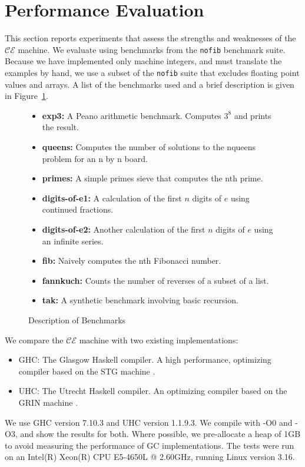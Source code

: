 \section{Performance Evaluation} \label{sec:eval}

This section reports experiments that assess the strengths and weaknesses of
the $\mathcal{CE}$ machine. We evaluate using benchmarks from the \texttt{nofib}
benchmark suite. Because we have implemented only machine integers, and must
translate the examples by hand, we use a subset of the \texttt{nofib} suite that
excludes floating point values and arrays. A list of the benchmarks used and a
brief description is given in Figure~\ref{fig:bench}.

\begin{figure}
\begin{itemize}
\item \textbf{exp3:} A Peano arithmetic benchmark. Computes $3^8$ and prints the result. 
\item \textbf{queens:} Computes the number of solutions to the nqueens problem
for an n by n board.
\item \textbf{primes:} A simple primes sieve that computes the nth prime.
\item \textbf{digits-of-e1:} A calculation of the first $n$ digits of $e$ using
continued fractions. 
\item \textbf{digits-of-e2:} Another calculation of the first $n$ digits of $e$ using an
infinite series.  
\item \textbf{fib:} Naively computes the nth Fibonacci number.
\item \textbf{fannkuch:} Counts the number of reverses of a subset of a list.
\item \textbf{tak:} A synthetic benchmark involving basic recursion.
\end{itemize}
\caption{Description of Benchmarks}
\label{fig:bench}
\end{figure}

We compare the $\mathcal{CE}$ machine with two existing implementations:

\begin{itemize}
\item GHC: The Glasgow Haskell compiler. A high performance, optimizing compiler
based on the STG machine \cite{jonesstg}.
\item UHC: The Utrecht Haskell compiler. An optimizing compiler based on the
GRIN machine \cite{boquist1997grin,dijkstra2009architecture}.
\end{itemize}

We use GHC version 7.10.3 and UHC version 1.1.9.3. We compile with -O0 and -O3,
and show the results for both. Where possible, we pre-allocate a heap of 1GB 
to avoid measuring the performance of GC implementations. The tests were run on
an Intel(R) Xeon(R) CPU E5-4650L @ 2.60GHz, running Linux version 3.16. 
